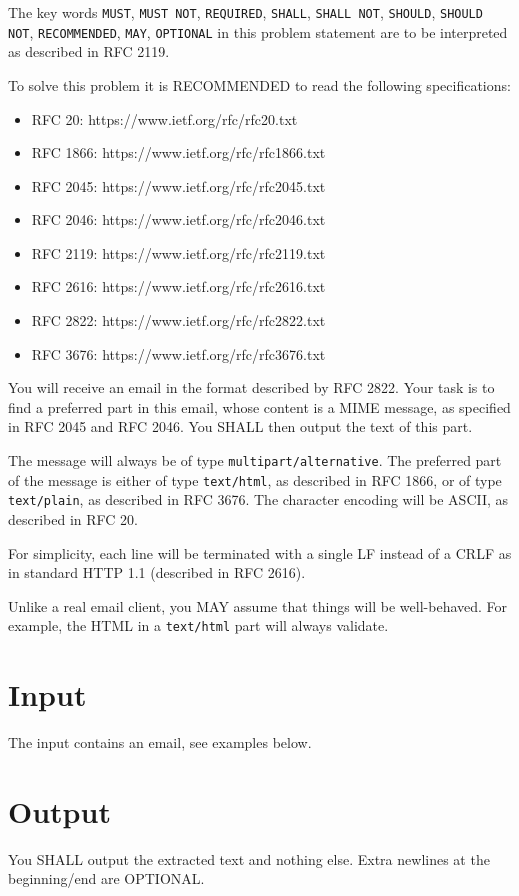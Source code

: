 
The key words \texttt{MUST}, \texttt{MUST NOT}, \texttt{REQUIRED}, \texttt{SHALL}, \texttt{SHALL NOT}, \texttt{SHOULD}, \texttt{SHOULD NOT}, \texttt{RECOMMENDED}, \texttt{MAY}, \texttt{OPTIONAL} in this problem statement are to be interpreted as described in RFC 2119.

To solve this problem it is RECOMMENDED to read the following specifications:
\begin{itemize}
	\item RFC 20: https://www.ietf.org/rfc/rfc20.txt
	\item RFC 1866: https://www.ietf.org/rfc/rfc1866.txt
	\item RFC 2045: https://www.ietf.org/rfc/rfc2045.txt
	\item RFC 2046: https://www.ietf.org/rfc/rfc2046.txt
	\item RFC 2119: https://www.ietf.org/rfc/rfc2119.txt
	\item RFC 2616: https://www.ietf.org/rfc/rfc2616.txt
	\item RFC 2822: https://www.ietf.org/rfc/rfc2822.txt
	\item RFC 3676: https://www.ietf.org/rfc/rfc3676.txt
\end{itemize}

You will receive an email in the format described by RFC 2822. Your task is to find a preferred part in this email, whose content is a MIME message, as specified in RFC 2045 and RFC 2046. You SHALL then output the text of this part.

The message will always be of type \texttt{multipart/alternative}. The preferred part of the message is either of type \texttt{text/html}, as described in RFC 1866, or of type \texttt{text/plain}, as described in RFC 3676. The character encoding will be ASCII, as described in RFC 20.


For simplicity, each line will be terminated with a single LF instead of a CRLF as in standard HTTP 1.1 (described in RFC 2616).

Unlike a real email client, you MAY assume that things will be well-behaved. For example, the HTML in a \texttt{text/html} part will always validate.

\section*{Input}
The input contains an email, see examples below.

\section*{Output}
You SHALL output the extracted text and nothing else. Extra newlines at the beginning/end are OPTIONAL.

